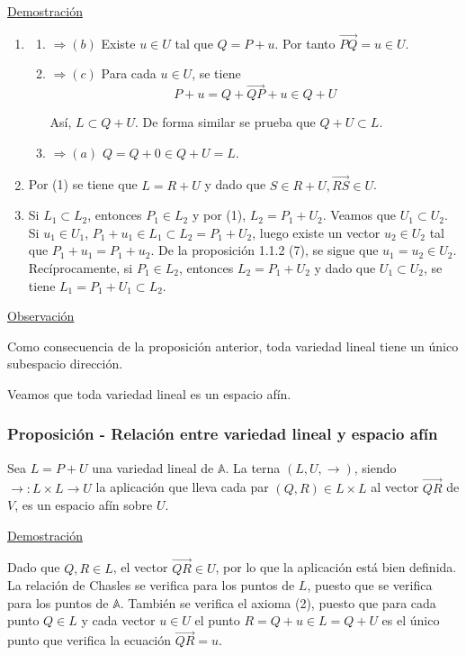 \documentclass[12pt, a4paper, ones, notitlepage, openany,titlepage]{article}
\begin{document}
\noindent\underline{Demostración}
\begin{enumerate}[label=(\arabic*)]
\item 
\begin{enumerate}[label=(\alph*)]
	\item $\Rightarrow(b)$ Existe $u \in U$ tal que $Q=P+u$. Por tanto $\overrightarrow{P Q}=u \in U$.

	\item $ \Rightarrow(c)$ Para cada $u \in U$, se tiene
	$$
	P+u=Q+\overrightarrow{Q P}+u \in Q+U
	$$

	Así, $L \subset Q+U$. De forma similar se prueba que $Q+U \subset L$.

	\item $\Rightarrow(a)$ $Q=Q+0 \in Q+U=L$.
\end{enumerate}
\item Por (1) se tiene que $L=R+U$ y dado que $S \in R+U, \overrightarrow{R S} \in U$.

\item Si $L_{1} \subset L_{2}$, entonces $P_{1} \in L_{2}$ y por (1), $L_{2}=P_{1}+U_{2}$. Veamos que $U_{1} \subset U_{2}$. Si $u_{1} \in U_{1}$, $P_{1}+u_{1} \in L_{1} \subset L_{2}=P_{1}+U_{2}$, luego existe un vector $u_{2} \in U_{2}$ tal que $P_{1}+u_{1}=P_{1}+u_{2}$. De la proposición 1.1.2 (7), se sigue que $u_{1}=u_{2} \in U_{2}$. Recíprocamente, si $P_{1} \in L_{2}$, entonces $L_{2}=P_{1}+U_{2}$ y dado que $U_{1} \subset U_{2}$, se tiene $L_{1}=P_{1}+U_{1} \subset L_{2}$.
\end{enumerate}

\noindent\underline{Observación}

Como consecuencia de la proposición anterior, toda variedad lineal tiene un único subespacio dirección.

Veamos que toda variedad lineal es un espacio afín.

\subsubsection{Proposición - Relación entre variedad lineal y espacio afín}
Sea $L=P+U$ una variedad lineal de $\mathbb{A}$. La terna $(L, U, \rightarrow)$, siendo $\rightarrow: L \times L \longrightarrow U$ la aplicación que lleva cada par $(Q, R) \in L \times L$ al vector $\overrightarrow{Q R}$ de $V$, es un espacio afín sobre $U$.

\noindent\underline{Demostración}

Dado que $Q, R \in L$, el vector $\overrightarrow{Q R} \in U$, por lo que la aplicación está bien definida. La relación de Chasles se verifica para los puntos de $L$, puesto que se verifica para los puntos de $\mathbb{A}$. También se verifica el axioma (2), puesto que para cada punto $Q \in L$ y cada vector $u \in U$ el punto $R=Q+u \in L=Q+U$ es el único punto que verifica la ecuación $\overrightarrow{Q R}=u$.
\end{document}
